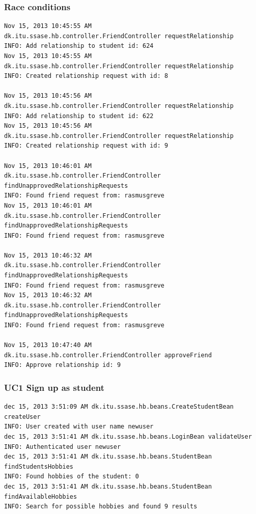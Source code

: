\documentclass[a4paper]{article}
\begin{document}
\subsubsection{Race conditions \label{sec:appendix:racecondition}}
\begin{verbatim}
Nov 15, 2013 10:45:55 AM 
dk.itu.ssase.hb.controller.FriendController requestRelationship
INFO: Add relationship to student id: 624
Nov 15, 2013 10:45:55 AM 
dk.itu.ssase.hb.controller.FriendController requestRelationship
INFO: Created relationship request with id: 8

Nov 15, 2013 10:45:56 AM 
dk.itu.ssase.hb.controller.FriendController requestRelationship
INFO: Add relationship to student id: 622
Nov 15, 2013 10:45:56 AM 
dk.itu.ssase.hb.controller.FriendController requestRelationship
INFO: Created relationship request with id: 9

Nov 15, 2013 10:46:01 AM 
dk.itu.ssase.hb.controller.FriendController findUnapprovedRelationshipRequests
INFO: Found friend request from: rasmusgreve
Nov 15, 2013 10:46:01 AM 
dk.itu.ssase.hb.controller.FriendController findUnapprovedRelationshipRequests
INFO: Found friend request from: rasmusgreve

Nov 15, 2013 10:46:32 AM 
dk.itu.ssase.hb.controller.FriendController findUnapprovedRelationshipRequests
INFO: Found friend request from: rasmusgreve
Nov 15, 2013 10:46:32 AM 
dk.itu.ssase.hb.controller.FriendController findUnapprovedRelationshipRequests
INFO: Found friend request from: rasmusgreve

Nov 15, 2013 10:47:40 AM 
dk.itu.ssase.hb.controller.FriendController approveFriend
INFO: Approve relationship id: 9
\end{verbatim}

\subsubsection{UC1 Sign up as student}
\begin{verbatim}
dec 15, 2013 3:51:09 AM dk.itu.ssase.hb.beans.CreateStudentBean createUser
INFO: User created with user name newuser
dec 15, 2013 3:51:41 AM dk.itu.ssase.hb.beans.LoginBean validateUser
INFO: Authenticated user newuser
dec 15, 2013 3:51:41 AM dk.itu.ssase.hb.beans.StudentBean findStudentsHobbies
INFO: Found hobbies of the student: 0
dec 15, 2013 3:51:41 AM dk.itu.ssase.hb.beans.StudentBean findAvailableHobbies
INFO: Search for possible hobbies and found 9 results
\end{verbatim}
\end{document}
